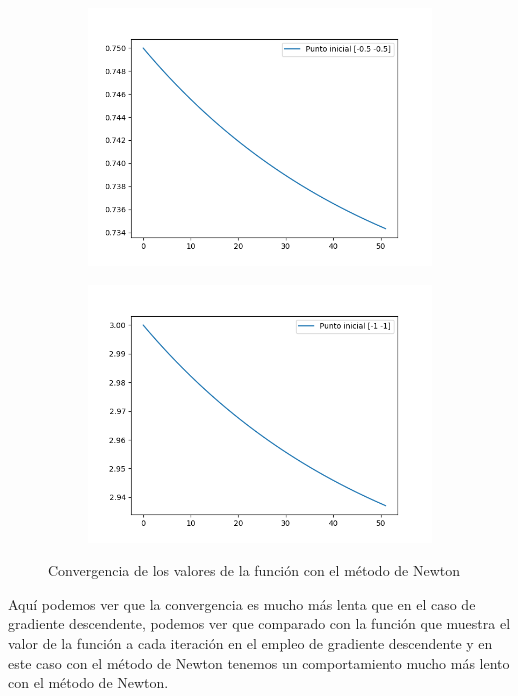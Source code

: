 \documentclass[12pt,a4paper]{article}
\begin{document}
\begin{figure}[H]
\begin{subfigure}{0.24\textwidth}
		\includegraphics[scale=0.3]{./Imagenes/bonus3.png}
	\end{subfigure}
	\begin{subfigure}{0.24\textwidth}
		\centering
		\includegraphics[scale=0.3]{./Imagenes/bonus4.png}
	\end{subfigure}
	\caption{Convergencia de los valores de la función con el método de Newton}
	\label{convergenciaNewton}
\end{figure}

Aquí podemos ver que la convergencia es mucho más lenta que en el caso de gradiente descendente, podemos ver que comparado con la función que muestra el valor de la función a cada iteración en el empleo de gradiente descendente y en este caso con el método de Newton tenemos un comportamiento mucho más lento con el método de Newton. 
\end{document}
